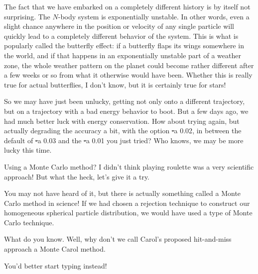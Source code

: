 \alice
The fact that we have embarked on a completely different history is by
itself not surprising.  The $N$-body system is exponentially unstable.
In other words, even a slight chance anywhere in the position or
velocity of any single particle will quickly lead to a completely
different behavior of the system.  This is what is popularly called
the butterfly effect: if a butterfly flaps its wings somewhere in the
world, and if that happens in an exponentially unstable part of a
weather zone, the whole weather pattern on the planet could become
rather different after a few weeks or so from what it otherwise
would have been.  Whether this is really true for actual butterflies,
I don't know, but it is certainly true for stars!

\carol
So we may have just been unlucky, getting not only onto a different
trajectory, but on a trajectory with a bad energy behavior to boot.
But a few days ago, we had much better luck with energy conservation.
How about trying again, but actually degrading the accuracy a bit,
with the option {\st -a 0.02}, in between the default of {\st -a 0.03}
and the {\st -a 0.01} you just tried?  Who knows, we may be more lucky
this time.

\bob
Using a Monte Carlo method?  I didn't think playing roulette was a
very scientific approach!  But what the heck, let's give it a try.

\alice
You may not have heard of it, but there is actually something called a
Monte Carlo method in science!  If we had chosen a rejection technique
to construct our homogeneous spherical particle distribution, we would
have used a type of Monte Carlo technique.

\bob
What do you know.  Well, why don't we call Carol's proposed
hit-and-miss approach a Monte Carol method.

\carol
You'd better start typing instead!

\cba

